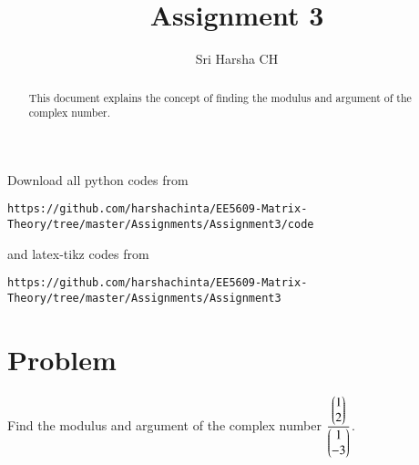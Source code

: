 \documentclass[journal,12pt,twocolumn]{IEEEtran}
\begin{document}
\renewcommand{\thefigure}{\theproblem}

\def\putbox#1#2#3{\makebox[0in][l]{\makebox[#1][l]{}\raisebox{\baselineskip}[0in][0in]{\raisebox{#2}[0in][0in]{#3}}}}
     \def\rightbox#1{\makebox[0in][r]{#1}}
     \def\centbox#1{\makebox[0in]{#1}}
     \def\topbox#1{\raisebox{-\baselineskip}[0in][0in]{#1}}
     \def\midbox#1{\raisebox{-0.5\baselineskip}[0in][0in]{#1}}
\vspace{3cm}
\title{Assignment 3}
\author{Sri Harsha CH}

\maketitle
\newpage

\bigskip
\renewcommand{\thefigure}{\theenumi}
\renewcommand{\thetable}{\theenumi}

\begin{abstract}
This document explains the concept of finding the modulus and argument of the complex number.
\end{abstract}

Download all python codes from 
\begin{lstlisting}
https://github.com/harshachinta/EE5609-Matrix-Theory/tree/master/Assignments/Assignment3/code
\end{lstlisting}
%
and latex-tikz codes from 
%
\begin{lstlisting}
https://github.com/harshachinta/EE5609-Matrix-Theory/tree/master/Assignments/Assignment3
\end{lstlisting}
%
\section{Problem}
Find the modulus and argument of the complex number $\frac{\begin{pmatrix}1\\ 2\end{pmatrix}}{\begin{pmatrix}1\\ -3\end{pmatrix}}$.
\end{document}
